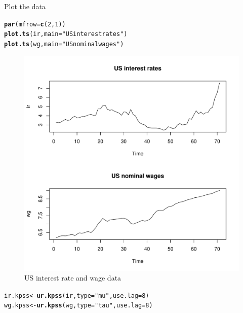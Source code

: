\documentclass{article}\usepackage{graphicx, color}
\makeatletter
\def\maxwidth{ %
  \ifdim\Gin@nat@width>\linewidth
    \linewidth
  \else
    \Gin@nat@width
  \fi
}
\newcommand{\hlfunctioncall}[1]{\textcolor[rgb]{0.501960784313725,0,0.329411764705882}{\textbf{#1}}}%
\newcommand{\hlstring}[1]{\textcolor[rgb]{0.6,0.6,1}{#1}}%
\newenvironment{kframe}{%
 \def\at@end@of@kframe{}%
 \ifinner\ifhmode%
  \def\at@end@of@kframe{\end{minipage}}%
  \begin{minipage}{\columnwidth}%
 \fi\fi%
 \def\FrameCommand##1{\hskip\@totalleftmargin \hskip-\fboxsep
 \colorbox{shadecolor}{##1}\hskip-\fboxsep
     \hskip-\linewidth \hskip-\@totalleftmargin \hskip\columnwidth}%
 \MakeFramed {\advance\hsize-\width
   \@totalleftmargin\z@ \linewidth\hsize
   \@setminipage}}%
 {\par\unskip\endMakeFramed%
 \at@end@of@kframe}
\newenvironment{knitrout}{}{} %
\makeatother
\begin{document}
Plot the data
\begin{knitrout}
\color{fgcolor}\begin{kframe}
\begin{alltt}
\hlfunctioncall{par}(mfrow = \hlfunctioncall{c}(2, 1))
\hlfunctioncall{plot.ts}(ir, main = \hlstring{"US interest rates"})
\hlfunctioncall{plot.ts}(wg, main = \hlstring{"US nominal wages"})
\end{alltt}
\end{kframe}\begin{figure}[h]

\includegraphics[width=\maxwidth]{figure/plot-kpss} \caption[US interest rate and wage data]{US interest rate and wage data\label{fig:plot-kpss}}
\end{figure}


\end{knitrout}


\begin{knitrout}
\color{fgcolor}\begin{kframe}
\begin{alltt}
ir.kpss <- \hlfunctioncall{ur.kpss}(ir, type = \hlstring{"mu"}, use.lag = 8)
wg.kpss <- \hlfunctioncall{ur.kpss}(wg, type = \hlstring{"tau"}, use.lag = 8)
\end{alltt}
\end{kframe}
\end{knitrout}
\end{document}
